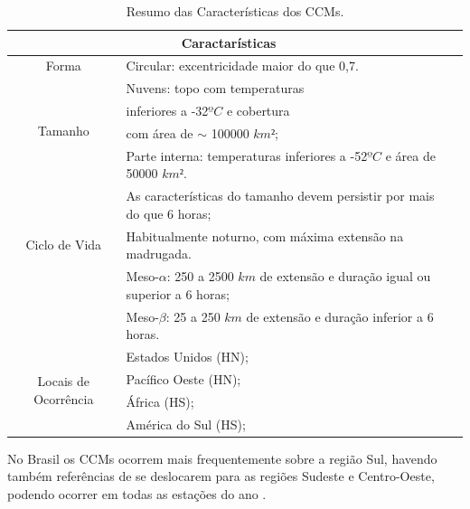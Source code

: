 \begin{table}[!h]
\caption{Resumo das Características dos CCMs.}
\label{tab01}
\centering
\begin{tabular}{c|p{12cm}l}
\hline
\multicolumn{2}{c}{Caractarísticas}                                                 \\
\hline
Forma                                       & Circular: excentricidade maior do que 0,7.\\
\hline
\multirow{4}{2cm}{Tamanho}                  & Nuvens: topo com temperaturas \\
                                            & inferiores a -32$ºC$ e cobertura \\
                                            & com área de $\sim$ 100000 $km²$; \\
                                            & Parte interna: temperaturas inferiores a -52$ºC$ e área de 50000 $km²$.         \\
\hline
\multirow{3}{2cm}{Ciclo de Vida}            & As características do tamanho devem persistir por mais do que 6 horas;   \\
                                            & Habitualmente noturno, com máxima extensão na madrugada.                \\
\hline
\multirow{3}{2cm}{Escala}                   & Meso-$\alpha$: 250 a 2500 $km$ de extensão e duração igual ou superior a 6 horas;      \\
                                            & Meso-$\beta$: 25 a 250 $km$ de extensão e duração inferior a 6 horas. \\
\hline
\multirow{4}{2cm}{Locais de Ocorrência} & Estados Unidos (HN);                  \\
                                            & Pacífico Oeste (HN);              \\
                                            & África (HS);                      \\
                                            & América do Sul (HS);              \\
\hline
\end{tabular}
\end{table}

No Brasil os CCMs ocorrem mais frequentemente sobre a região Sul, havendo também referências de se deslocarem para as regiões Sudeste e Centro-Oeste, podendo ocorrer em todas as estações do ano \cite{silvadias96}.

